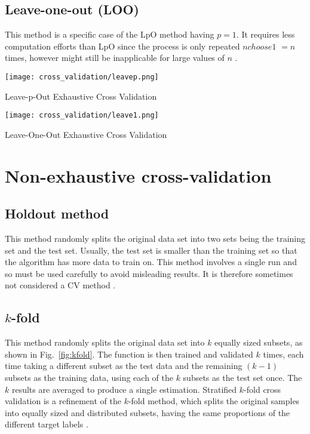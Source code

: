 \subsection{Leave-one-out (LOO)} 
This method is a specific case of the LpO method having $p=1$. It requires less computation efforts than LpO since the process is only repeated $n choose 1$ $= n$ times, however might still be inapplicable for large values of $n$ \citep{arlot2010survey}. 


\begin{marginfigure}%
	\centering
    \texttt{[image: cross\_validation/leavep.png]}
	\caption{Leave-p-Out Exhaustive Cross Validation}
\end{marginfigure}
\begin{marginfigure}%
	\texttt{[image: cross\_validation/leave1.png]}
	\caption{Leave-One-Out Exhaustive Cross Validation}
	\label{fig:leavep}
\end{marginfigure}

\section{Non-exhaustive cross-validation}

\subsection{Holdout method} 
This method randomly splits the original data set into two sets being the training set and the test set. Usually, the test set is smaller than the training set so that the algorithm has more data to train on. This method involves a single run and so must be used carefully to avoid misleading results. It is therefore sometimes not considered a CV method \citep{kohavi1995study}.

\subsection{$k$-fold} 
This method randomly splits the original data set into $k$ equally sized subsets, as shown in Fig.~\ref{fig:kfold}. The function is then trained and validated $k$ times, each time taking a different subset as the test data and the remaining $(k-1)$ subsets as the training data, using each of the $k$ subsets as the test set once. The $k$ results are averaged to produce a single estimation. Stratified $k$-fold cross validation is a refinement of the $k$-fold method, which splits the original samples into equally sized and distributed subsets, having the same proportions of the different target labels \citep{kohavi1995study}.

